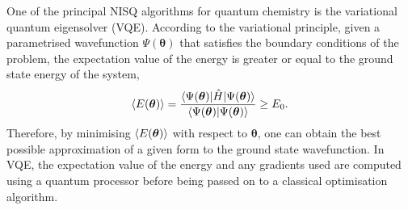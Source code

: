 \documentclass[%
 reprint,
 amsmath,amssymb,
 aps,
]{revtex4-2}
\begin{document}
One of the principal NISQ algorithms for quantum chemistry is the variational quantum eigensolver (VQE).\cite{Peruzzo2014} According to the variational principle, given a parametrised wavefunction $\Psi(\boldsymbol{\theta})$ that satisfies the boundary conditions of the problem, the expectation value of the energy is greater or equal to the ground state energy of the system,
\begin{equation}
\braket{E(\boldsymbol{\theta})} = \frac{\braket{\Psi(\boldsymbol\theta)|\hat H | \Psi(\boldsymbol{\theta})}}{\braket{\Psi(\boldsymbol{\theta})| \Psi(\boldsymbol{\theta})}} \geq E_0.
\end{equation}
Therefore, by minimising $\braket{E(\boldsymbol{\theta})}$ with respect to $\boldsymbol{\theta}$, one can obtain the best possible approximation of a given form to the ground state wavefunction.
In VQE, the expectation value of the energy and any gradients used are computed using a quantum processor before being passed on to a classical optimisation algorithm.
\end{document}
